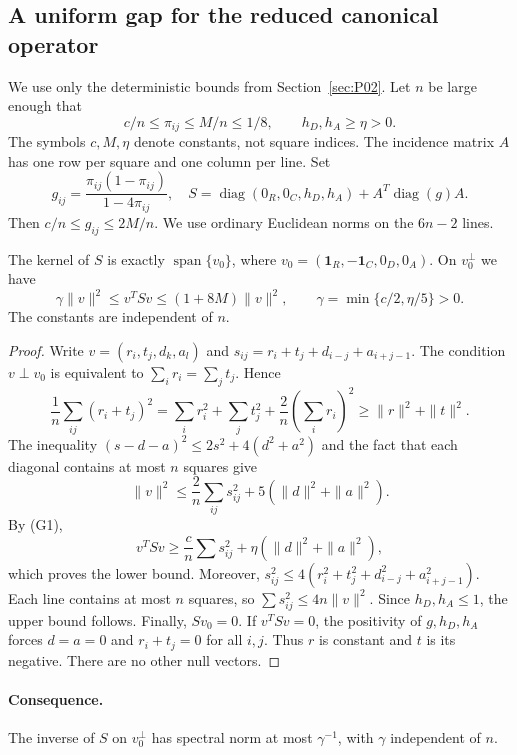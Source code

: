 \subsection{A uniform gap for the reduced canonical operator}\label{sec:P03}
We use only the deterministic bounds from Section~\ref{sec:P02}.
Let $n$ be large enough that
\[
 c/n\le\pi_{ij}\le M/n\le1/8,\qquad h_D,h_A\ge\eta>0.
\]
The symbols $c,M,\eta$ denote constants, not square indices.
The incidence matrix $A$ has one row per square and one column per line.
Set
\[
 g_{ij}=\frac{\pi_{ij}(1-\pi_{ij})}{1-4\pi_{ij}},\quad
 S=\operatorname{diag}(0_R,0_C,h_D,h_A)+A^T\operatorname{diag}(g)A.
                                                        \tag{G1}
\]
Then $c/n\le g_{ij}\le2M/n$.
We use ordinary Euclidean norms on the $6n-2$ lines.

\begin{proposicion}
The kernel of $S$ is exactly
$\operatorname{span}\{v_0\}$, where
$v_0=(\mathbf1_R,-\mathbf1_C,0_D,0_A)$.
On $v_0^\perp$ we have
\[
 \gamma\|v\|^2\le v^TSv\le(1+8M)\|v\|^2,
 \qquad \gamma=\min\{c/2,\eta/5\}>0.               \tag{G2}
\]
The constants are independent of $n$.
\end{proposicion}
\begin{proof}
Write $v=(r_i,t_j,d_k,a_l)$ and
$s_{ij}=r_i+t_j+d_{i-j}+a_{i+j-1}$.
The condition $v\perp v_0$ is equivalent to $\sum_i r_i=\sum_jt_j$.
Hence
\[
 \frac1n\sum_{ij}(r_i+t_j)^2
 =\sum_i r_i^2+\sum_jt_j^2+
       \frac2n\left(\sum_i r_i\right)^2
 \ge\|r\|^2+\|t\|^2.
\]
The inequality $(s-d-a)^2\le2s^2+4(d^2+a^2)$
and the fact that each diagonal contains at most $n$ squares
give
\[
 \|v\|^2\le\frac2n\sum_{ij}s_{ij}^2
                        +5(\|d\|^2+\|a\|^2).     \tag{G3}
\]
By (G1),
\[
 v^TSv\ge\frac cn\sum s_{ij}^2+
                          \eta(\|d\|^2+\|a\|^2),
\]
which proves the lower bound. Moreover,
$s_{ij}^2\le4(r_i^2+t_j^2+d_{i-j}^2+a_{i+j-1}^2)$.
Each line contains at most $n$ squares, so
$\sum s_{ij}^2\le4n\|v\|^2$. Since $h_D,h_A\le1$,
the upper bound follows.
Finally, $Sv_0=0$. If $v^TSv=0$, the positivity of
$g,h_D,h_A$ forces $d=a=0$ and $r_i+t_j=0$ for all $i,j$.
Thus $r$ is constant and $t$ is its negative. There are no other null vectors.
\end{proof}

\paragraph{Consequence.}
The inverse of $S$ on $v_0^\perp$ has spectral norm
at most $\gamma^{-1}$, with $\gamma$ independent of $n$.
